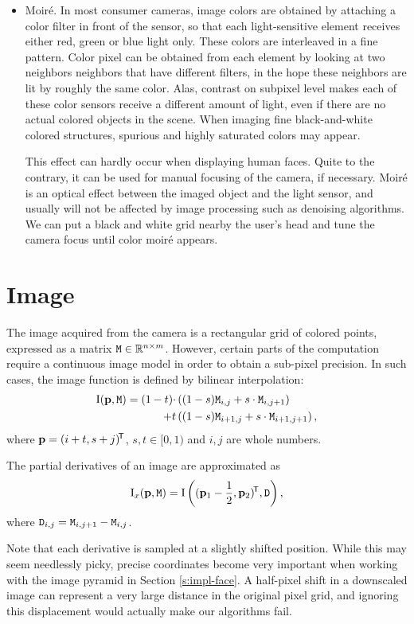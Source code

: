 \begin{itemize}
\item
Moiré.
In most consumer cameras, image colors are obtained by attaching a color filter in front of the sensor, so that each light-sensitive element receives either red, green or blue light only.
These colors are interleaved in a fine pattern.
Color pixel can be obtained from each element by looking at two neighbors neighbors that have different filters, in the hope these neighbors are lit by roughly the same color.
Alas, contrast on subpixel level makes each of these color sensors receive a different amount of light, even if there are no actual colored objects in the scene.
When imaging fine black-and-white colored structures, spurious and highly saturated colors may appear.

This effect can hardly occur when displaying human faces.
Quite to the contrary, it can be used for manual focusing of the camera, if necessary.
Moiré is an optical effect between the imaged object and the light sensor, and usually will not be affected by image processing such as denoising algorithms.
We can put a black and white grid nearby the user's head and tune the camera focus until color moiré appears.

\end{itemize}

\section{Image}
\label{s.imagemodel}

The image acquired from the camera is a rectangular grid of colored points, expressed as a matrix $\mathtt{M} \in \mathbb{R}^{n\times m}$.
However, certain parts of the computation require a continuous image model in order to obtain a sub-pixel precision.
In such cases, the image function is defined by bilinear interpolation:
\begin{align}
\mathrm{I}(\mathbf{p}, \mathtt{M}) = (1 - t) \cdot&\left((1 - s) \mathtt{M}_{i, j} + s \cdot \mathtt{M}_{i, j+1} \right) \\
+ t&\left((1 - s) \mathtt{M}_{i+1, j} + s \cdot \mathtt{M}_{i+1, j+1} \right), \notag
\end{align}
where $\mathbf{p} = (i + t, s + j)^{\!\mathsf{T}}$, $s, t \in \lbrack0, 1)$ and $i, j$ are whole numbers.

The partial derivatives of an image are approximated as
$$
\mathrm{I}_x(\mathbf{p}, \mathtt{M}) = \mathrm{I}\left((\mathbf{p}_1 - \frac 1 2, \mathbf{p}_2)^{\!\mathsf{T}}, \mathtt{D}\right),
$$
where $\mathtt{D}_{i, j} = \mathtt{M}_{i,j+1} - \mathtt{M}_{i, j}$.

Note that each derivative is sampled at a slightly shifted position.
While this may seem needlessly picky, precise coordinates become very important when working with the image pyramid in Section \ref{s:impl-face}.
A half-pixel shift in a downscaled image can represent a very large distance in the original pixel grid, and ignoring this displacement would actually make our algorithms fail.

